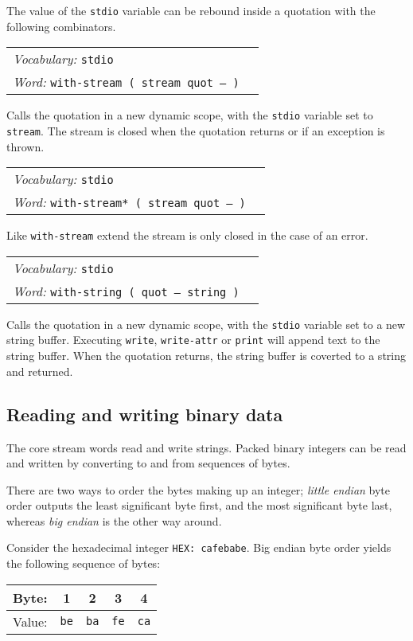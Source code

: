 \documentclass{book}
\newcommand{\vocabulary}[1]{\emph{Vocabulary:} \texttt{#1}&\\}
\newcommand{\ordinaryword}[2]{\index{\texttt{#1}}\emph{Word:} \texttt{#2}&\\}
\newcommand{\wordtable}[1]{


\begin{tabularx}{12cm}{lX}
\hline
#1
\hline
\end{tabularx}

}
\begin{document}
The value of the \texttt{stdio} variable can be rebound inside a quotation with the following combinators.

\wordtable{
\vocabulary{stdio}
\ordinaryword{with-stream}{with-stream ( stream quot -- )}
}
Calls the quotation in a new dynamic scope, with the \texttt{stdio} variable set to \texttt{stream}. The stream is closed when the quotation returns or if an exception
is thrown.
\wordtable{
\vocabulary{stdio}
\ordinaryword{with-stream*}{with-stream* ( stream quot -- )}
}
Like \verb|with-stream| extend the stream is only closed in the case of an error.

\wordtable{
\vocabulary{stdio}
\ordinaryword{with-string}{with-string ( quot -- string )}

}
Calls the quotation in a new dynamic scope, with the \texttt{stdio} variable set to a new string buffer. Executing \texttt{write}, \texttt{write-attr} or \texttt{print} will append text to the string buffer. When the quotation returns, the string buffer is coverted to
a string and returned.

\subsection{Reading and writing binary data}

The core stream words read and write strings. Packed binary integers can be read and written by converting to and from sequences of bytes.

There are two ways to order the bytes making up an integer; \emph{little endian} byte order outputs the least significant byte first, and the most significant byte last, whereas \emph{big endian} is the other way around.

Consider the hexadecimal integer \texttt{HEX: cafebabe}. Big endian byte order yields the following sequence of bytes:

\begin{tabular}{l|c|c|c|c}
Byte:&1&2&3&4\\
\hline
Value:&\verb|be|&\verb|ba|&\verb|fe|&\verb|ca|\\
\end{tabular}
\end{document}
